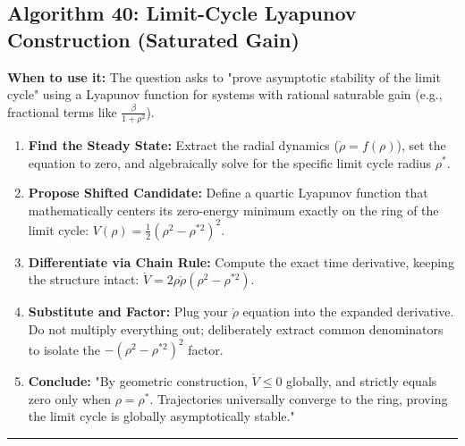 \documentclass[11pt, a4paper]{report}
\begin{document}
\subsection*{Algorithm 40: Limit-Cycle Lyapunov Construction (Saturated Gain)}
\textbf{When to use it:} The question asks to "prove asymptotic stability of the limit cycle" using a Lyapunov function for systems with rational saturable gain (e.g., fractional terms like $\frac{\beta}{1+\rho^2}$).
\begin{enumerate}[label=\textbf{\arabic*.}]
    \item \textbf{Find the Steady State:} Extract the radial dynamics ($\dot{\rho} = f(\rho)$), set the equation to zero, and algebraically solve for the specific limit cycle radius $\rho^*$.
    \item \textbf{Propose Shifted Candidate:} Define a quartic Lyapunov function that mathematically centers its zero-energy minimum exactly on the ring of the limit cycle: $V(\rho) = \frac{1}{2}(\rho^2 - \rho^{*2})^2$.
    \item \textbf{Differentiate via Chain Rule:} Compute the exact time derivative, keeping the structure intact: $\dot{V} = 2\rho\dot{\rho}(\rho^2 - \rho^{*2})$.
    \item \textbf{Substitute and Factor:} Plug your $\dot{\rho}$ equation into the expanded derivative. Do not multiply everything out; deliberately extract common denominators to isolate the $-(\rho^2 - \rho^{*2})^2$ factor.
    \item \textbf{Conclude:} "By geometric construction, $\dot{V} \le 0$ globally, and strictly equals zero only when $\rho = \rho^*$. Trajectories universally converge to the ring, proving the limit cycle is globally asymptotically stable."
\end{enumerate}
\vspace{1em}
\noindent\rule{\textwidth}{0.4pt}
\vspace{1em}
\end{document}

